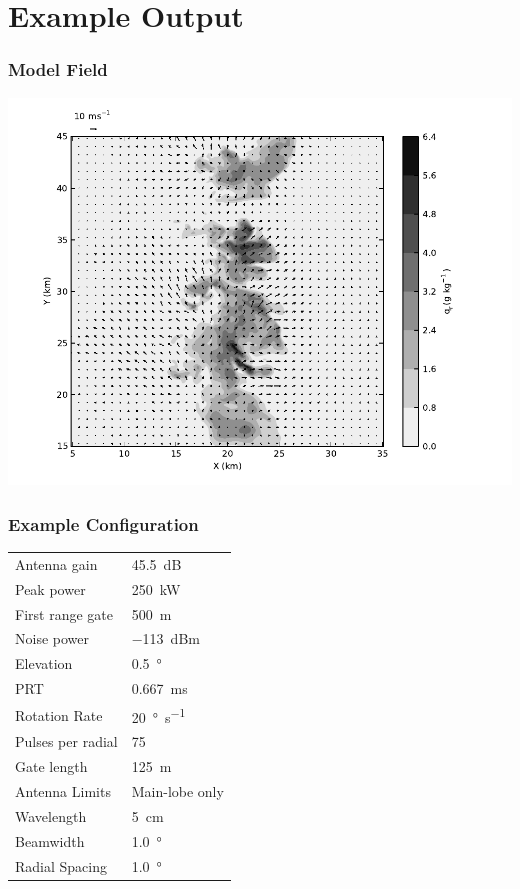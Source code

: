 \documentclass[red]{beamer}
\begin{document}
\section{Example Output}
\begin{frame}
	\frametitle{Model Field}
	\begin{center}
		\includegraphics[scale=0.5]{figures/commas_wz_3600_qr_wind_vectors.pdf}	
	\end{center}
\end{frame}

\begin{frame}
	\frametitle{Example Configuration}
	\begin{center}
	    \begin{tabular}{ | l | l | }
	        \hline
	        Antenna gain & \SI{45.5}{dB} \\
	        Peak power & \SI{250}{\kilo\watt} \\
	        First range gate & \SI{500}{\meter} \\
	        Noise power & \SI{-113}{dBm} \\
	        Elevation & \SI{0.5}{\degree} \\
	        PRT & \SI{0.667}{\milli\second} \\
	        Rotation Rate & \SI{20}{\degree\per\second} \\
	        Pulses per radial & \num{75} \\
	        Gate length & \SI{125}{\meter} \\
	        Antenna Limits & Main-lobe only \\
			Wavelength &  \SI{5}{\centi\meter} \\
			Beamwidth & \SI{1.0}{\degree} \\
			Radial Spacing & \SI{1.0}{\degree} \\
			\hline
	    \end{tabular}
	\end{center}
\end{frame}
\end{document}
